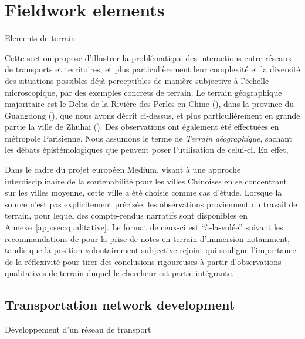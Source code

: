 


\newpage


\section{Fieldwork elements}{Elements de terrain}

\label{sec:qualitative}




Cette section propose d'illustrer la problématique des interactions entre réseaux de transports et territoires, et plus particulièrement leur complexité et la diversité des situations possibles déjà perceptibles de manière subjective à l'échelle microscopique, par des exemples concrets de terrain. Le terrain géographique majoritaire est le Delta de la Rivière des Perles en Chine (), dans la province du Guangdong (), que nous avons décrit ci-dessus, et plus particulièrement en grande partie la ville de Zhuhai (). Des observations ont également été effectuées en métropole Parisienne. Nous assumons le terme de \emph{Terrain géographique}, sachant les débats épistémologiques que peuvent poser l'utilisation de celui-ci. En effet,

Dans le cadre du projet européen Medium, visant à une approche interdisciplinaire de la soutenabilité pour les villes Chinoises en se concentrant sur les villes moyenne, cette ville a été choisie comme cas d'étude. Lorsque la source n'est pas explicitement précisée, les observations proviennent du travail de terrain, pour lequel des compte-rendus narratifs sont disponibles en Annexe~\ref{app:sec:qualitative}. Le format de ceux-ci est ``à-la-volée'' suivant les recommandations de \cite{goffman1989fieldwork} pour la prise de notes en terrain d'immersion notamment, tandis que la position volontairement subjective rejoint \cite{ball1990self} qui souligne l'importance de la réflexivité pour tirer des conclusions rigoureuses à partir d'observations qualitatives de terrain duquel le chercheur est partie intégrante.







\subsection{Transportation network development}{Développement d'un réseau de transport}



